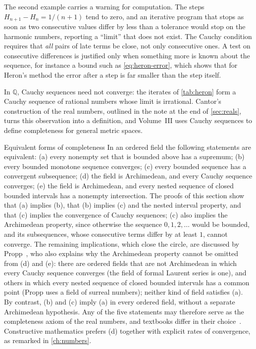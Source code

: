 The second example carries a warning for computation. The steps $H_{n+1}-H_n=1/(n+1)$ tend to zero, and an iterative program that stops as soon as two consecutive values differ by less than a tolerance would stop on the harmonic numbers, reporting a ``limit'' that does not exist. The Cauchy condition requires that \emph{all} pairs of late terms be close, not only consecutive ones. A test on consecutive differences is justified only when something more is known about the sequence, for instance a bound such as \eqref{eq:heron-error}, which shows that for Heron's method the error after a step is far smaller than the step itself.

In $\mathbb Q$, Cauchy sequences need not converge: the iterates of \cref{tab:heron} form a Cauchy sequence of rational numbers whose limit is irrational. Cantor's construction of the real numbers, outlined in the note at the end of \cref{sec:reals}, turns this observation into a definition, and Volume~III uses Cauchy sequences to define completeness for general metric spaces.

\begin{note}{Equivalent forms of completeness}
In an ordered field the following statements are equivalent: (a) every nonempty set that is bounded above has a supremum; (b) every bounded monotone sequence converges; (c) every bounded sequence has a convergent subsequence; (d) the field is Archimedean, and every Cauchy sequence converges; (e) the field is Archimedean, and every nested sequence of closed bounded intervals has a nonempty intersection. The proofs of this section show that (a) implies (b), that (b) implies (c) and the nested interval property, and that (c) implies the convergence of Cauchy sequences; (c) also implies the Archimedean property, since otherwise the sequence $0,1,2,\ldots$ would be bounded, and its subsequences, whose consecutive terms differ by at least $1$, cannot converge. The remaining implications, which close the circle, are discussed by Propp~\cite{propp2013}, who also explains why the Archimedean property cannot be omitted from (d) and (e): there are ordered fields that are not Archimedean in which every Cauchy sequence converges (the field of formal Laurent series is one), and others in which every nested sequence of closed bounded intervals has a common point (Propp uses a field of surreal numbers); neither kind of field satisfies (a). By contrast, (b) and (c) imply (a) in every ordered field, without a separate Archimedean hypothesis. Any of the five statements may therefore serve as the completeness axiom of the real numbers, and textbooks differ in their choice~\cite{bartle2011,abbott2015}. Constructive mathematics prefers (d) together with explicit rates of convergence, as remarked in \cref{ch:numbers}.
\end{note}

